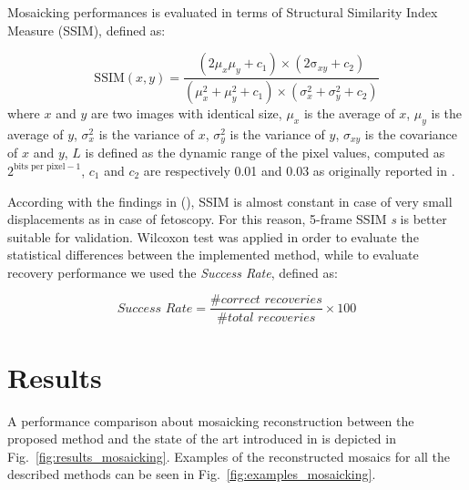 \documentclass[sn-basic]{sn-jnl}%
\begin{document}
Mosaicking performances is evaluated in terms of Structural Similarity Index Measure (SSIM), defined as:

\begin{equation} \label{eq:ssim}
\textrm{SSIM}(x,y) = \frac{(2\mu_x\mu_y + c_1)\times (2\mathrm{\sigma}_{xy} + c_2)}{(\mu_x^2 + \mu_y^2 + c_1)\times (\sigma_x^2 + \sigma_y^2 + c_2)}
\end{equation}
\noindent where $x$ and $y$ are two images with identical size, $\mathit{\mu_{x}}$ is the average of $x$, $\mathit{\mu_{y}}$ is the average of $y$, $\mathit{\sigma_{x}^{2}}$ is the variance of $x$, $\mathit{\sigma_{y}^{2}}$ is the variance of $y$, $\mathit{\sigma_{xy}}$ is the covariance of $x$ and $y$, $L$ is defined as the dynamic range of the pixel values, computed as $2^{\textrm{bits per pixel}-1}$, $\mathit{c_1}$ and $\mathit{c_2}$ are respectively 0.01 and 0.03 as originally reported in \cite{ssim2004}.

According with the findings in (\cite{BanoMosaicking2020}), SSIM is almost constant in case of very small displacements as in case of fetoscopy. For this reason, 5-frame SSIM \textit{s} is better suitable for validation.
Wilcoxon test was applied in order to evaluate the statistical differences between the implemented method, while to evaluate recovery performance we used the  \textit{Success Rate}, defined as: 

\begin{equation} \label{eq:recovery_metric}
\textit{Success Rate} = \frac{\#\textit{correct recoveries}}{\#\textit{total recoveries}}\times 100
\end{equation}




\section{Results}\label{sec:reseults}

A performance comparison about mosaicking reconstruction between the proposed method and the state of the art introduced in \cite{Bano2020} is depicted in Fig.~\ref{fig:results_mosaicking}.
Examples of the reconstructed mosaics for all the described methods can be seen in Fig.~\ref{fig:examples_mosaicking}.
\end{document}

